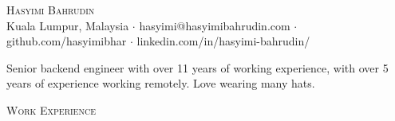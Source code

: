 \documentclass[a4paper]{article}
\newcommand{\lineunder} {
    \vspace*{-8pt} \\
    \hspace*{-18pt} \hrulefill \\
}
\newcommand{\header} [1] {
    {\hspace*{-18pt}\vspace*{6pt} \textsc{#1}}
    \vspace*{-6pt} \lineunder
}
\begin{document}
\vspace*{-40pt}

    

\vspace*{-10pt}
\begin{center}
	{\Huge \scshape {Hasyimi Bahrudin}}
	\\
	Kuala Lumpur, Malaysia $\cdot$
	hasyimi@hasyimibahrudin.com $\cdot$
	github.com/hasyimibhar $\cdot$
	linkedin.com/in/hasyimi-bahrudin/
	\\
\end{center}


\begin{center}
	Senior backend engineer with over 11 years of working experience, with over 5 years of experience working remotely. Love wearing many hats.
\end{center}

\header{Work Experience}
\vspace{1mm}
\end{document}
